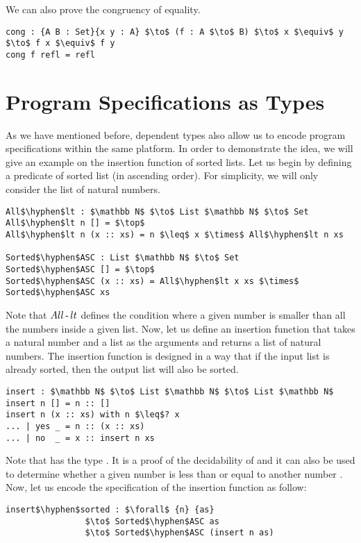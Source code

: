 \par We can also prove the congruency of equality.
\begin{lstlisting}[mathescape=true,xleftmargin=.05\textwidth]
cong : {A B : Set}{x y : A} $\to$ (f : A $\to$ B) $\to$ x $\equiv$ y $\to$ f x $\equiv$ f y
cong f refl = refl
\end{lstlisting}


\section{Program Specifications as Types}
\par As we have mentioned before, dependent types also allow us to encode program
specifications within the same platform. In order to demonstrate the
idea, we will give an example on the insertion function of sorted
lists. Let us begin by defining a predicate
of sorted list (in ascending order). For simplicity, we will only consider the list of natural
numbers. 
\begin{lstlisting}[mathescape=true,xleftmargin=.25\textwidth]
All$\hyphen$lt : $\mathbb N$ $\to$ List $\mathbb N$ $\to$ Set
All$\hyphen$lt n [] = $\top$
All$\hyphen$lt n (x :: xs) = n $\leq$ x $\times$ All$\hyphen$lt n xs

Sorted$\hyphen$ASC : List $\mathbb N$ $\to$ Set
Sorted$\hyphen$ASC [] = $\top$
Sorted$\hyphen$ASC (x :: xs) = All$\hyphen$lt x xs $\times$ Sorted$\hyphen$ASC xs
\end{lstlisting}

\par Note that \(All\operatorname{-} lt\) defines the condition where a given
number is smaller than all the numbers inside a given list. Now, let
us define an insertion function that takes a natural number and a list as the arguments and returns a list of
natural numbers. The insertion function is designed in a way that if the
input list is already sorted, then the output list will also be sorted. 
\begin{lstlisting}[mathescape=true,xleftmargin=.25\textwidth]
insert : $\mathbb N$ $\to$ List $\mathbb N$ $\to$ List $\mathbb N$
insert n [] = n :: []
insert n (x :: xs) with n $\leq$? x
... | yes _ = n :: (x :: xs)
... | no  _ = x :: insert n xs
\end{lstlisting}

\par Note that  has the type . It is a proof of the decidability of \mb{\leq} and it can also be used to determine whether
a given number  is less than or equal to another number
. Now, let us encode the specification of the insertion function
as follow: 
\begin{lstlisting}[mathescape=true,xleftmargin=.25\textwidth]
insert$\hyphen$sorted : $\forall$ {n} {as} 
                $\to$ Sorted$\hyphen$ASC as 
                $\to$ Sorted$\hyphen$ASC (insert n as)
\end{lstlisting}

